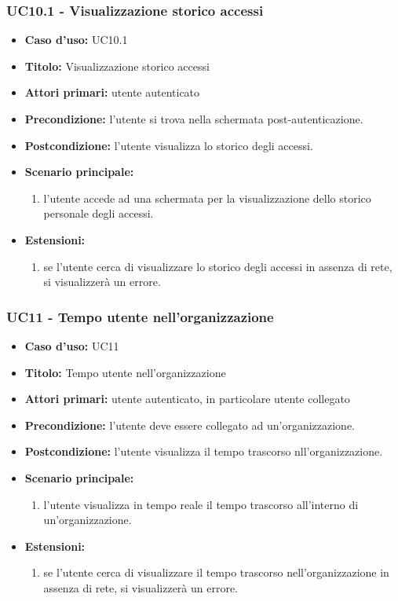 \documentclass[casi-duso]{subfiles}
\begin{document}
\subsubsection{UC10.1 - Visualizzazione storico accessi}
\label{subsub:uc10.1utente}
\begin{itemize}
  \item \textbf{Caso d’uso:} UC10.1
  \item \textbf{Titolo:} Visualizzazione storico accessi
  \item \textbf{Attori primari:} utente autenticato
  \item \textbf{Precondizione:} l'utente si trova nella schermata post-autenticazione.
  \item \textbf{Postcondizione:} l'utente visualizza lo storico degli accessi.
  \item \textbf{Scenario principale:} 
  \begin{enumerate}
    \item l'utente accede ad una schermata per la visualizzazione dello storico personale degli accessi.
  \end{enumerate}
  \item \textbf{Estensioni:} 
  \begin{enumerate}
    \item se l'utente cerca di visualizzare lo storico degli accessi in assenza di rete, si visualizzerà un errore.
  \end{enumerate} 
\end{itemize}

\subsubsection{UC11 - Tempo utente nell'organizzazione}
\label{subsub:uc11utente}
\begin{itemize}
  \item \textbf{Caso d’uso:} UC11
  \item \textbf{Titolo:} Tempo utente nell'organizzazione
  \item \textbf{Attori primari:} utente autenticato, in particolare utente collegato
  \item \textbf{Precondizione:} l'utente deve essere collegato ad un'organizzazione.
  \item \textbf{Postcondizione:} l'utente visualizza il tempo trascorso nll'organizzazione.
  \item \textbf{Scenario principale:} 
  \begin{enumerate}
    \item l'utente visualizza in tempo reale il tempo trascorso all'interno di un'organizzazione.
  \end{enumerate}  
  \item \textbf{Estensioni:} 
  \begin{enumerate}
    \item se l'utente cerca di visualizzare il tempo trascorso nell'organizzazione in assenza di rete, si visualizzerà un errore.
  \end{enumerate}  
\end{itemize}
\end{document}
